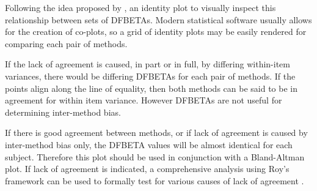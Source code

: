 \documentclass[12pt, a4paper]{report}
\theoremstyle{plain}
\theoremstyle{definition}
\theoremstyle{remark}
\begin{document}
Following the idea proposed by \citet{BA86}, an identity plot to visually inspect this relationship between sets of DFBETAs. Modern statistical software usually allows for the creation of co-plots, so a grid of identity plots may be easily rendered for comparing each pair of methods.

If the lack of agreement is caused, in part or in full, by differing within-item variances, there would be differing DFBETAs for each pair of methods. If the points align along the line of equality, then both methods can be said to be in agreement for within item variance. However DFBETAs are not useful for determining inter-method bias. 

If there is good agreement between methods, or if lack of agreement is caused by inter-method bias only, the DFBETA values will be almost identical for each subject. Therefore this plot should be used in conjunction with a Bland-Altman plot. If lack of agreement is indicated, a comprehensive analysis using Roy's framework can be used to formally test for various causes of lack of agreement \citet{ARoy2009}.
	
\end{document}
